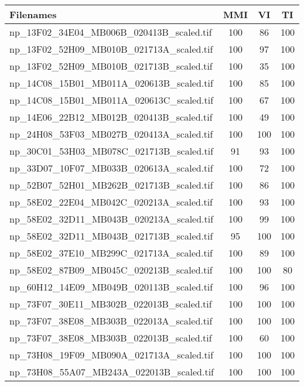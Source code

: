 \begin{tabular}{lccc}
\hline
 Filenames                                & MMI & VI  & TI  \\ \hline \hline
 np\_13F02\_34E04\_MB006B\_020413B\_scaled.tif & 100 & 86  & 100 \\
 np\_13F02\_52H09\_MB010B\_021713A\_scaled.tif & 100 & 97  & 100 \\
 np\_13F02\_52H09\_MB010B\_021713B\_scaled.tif & 100 & 35  & 100 \\
 np\_14C08\_15B01\_MB011A\_020613B\_scaled.tif & 100 & 85  & 100 \\
 np\_14C08\_15B01\_MB011A\_020613C\_scaled.tif & 100 & 67  & 100 \\
 np\_14E06\_22B12\_MB012B\_020413B\_scaled.tif & 100 & 49  & 100 \\
 np\_24H08\_53F03\_MB027B\_020413A\_scaled.tif & 100 & 100 & 100 \\
 np\_30C01\_53H03\_MB078C\_021713B\_scaled.tif & 91  & 93  & 100 \\
 np\_33D07\_10F07\_MB033B\_020613A\_scaled.tif & 100 & 72  & 100 \\
 np\_52B07\_52H01\_MB262B\_021713B\_scaled.tif & 100 & 86  & 100 \\
 np\_58E02\_22E04\_MB042C\_020213A\_scaled.tif & 100 & 93  & 100 \\
 np\_58E02\_32D11\_MB043B\_020213A\_scaled.tif & 100 & 99  & 100 \\
 np\_58E02\_32D11\_MB043B\_021713B\_scaled.tif & 95  & 100 & 100 \\
 np\_58E02\_37E10\_MB299C\_021713A\_scaled.tif & 100 & 89  & 100 \\
 np\_58E02\_87B09\_MB045C\_020213B\_scaled.tif & 100 & 100 & 80  \\
 np\_60H12\_14E09\_MB049B\_020113B\_scaled.tif & 100 & 96  & 100 \\
 np\_73F07\_30E11\_MB302B\_022013B\_scaled.tif & 100 & 100 & 100 \\
 np\_73F07\_38E08\_MB303B\_022013A\_scaled.tif & 100 & 100 & 100 \\
 np\_73F07\_38E08\_MB303B\_022013B\_scaled.tif & 100 & 60  & 100 \\
 np\_73H08\_19F09\_MB090A\_021713A\_scaled.tif & 100 & 100 & 100 \\
 np\_73H08\_55A07\_MB243A\_022013B\_scaled.tif & 100 & 100 & 100 \\
\hline
\end{tabular}